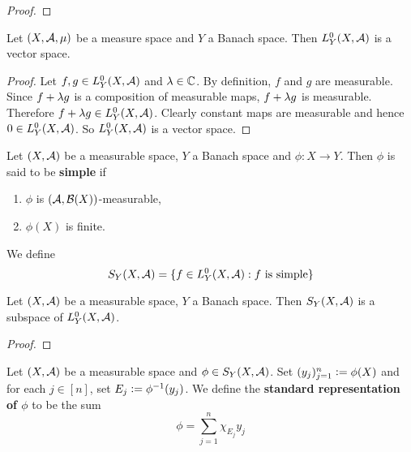 \documentclass{book}
\begin{document}
	\begin{proof}
		
	\end{proof}


	
	\begin{ex}  
	Let $(X, \mathcal{A}, \mu)$ be a measure space and $Y$ a Banach space. Then $L_Y^0(X, \mathcal{A})$ is a vector space.
	\end{ex}
	
	\begin{proof}
	Let $f, g \in L_Y^0(X, \mathcal{A})$ and $\lambda \in \mathbb{C}$. By definition, $f$ and $g$ are measurable. Since $f+\lambda g $ is a composition of measurable maps, $f + \lambda g$ is measurable. Therefore $f + \lambda g \in L_Y^0(X, \mathcal{A})$. Clearly constant maps are measurable and hence $0 \in L_Y^0(X, \mathcal{A})$. So $L_Y^0(X, \mathcal{A})$ is a vector space. 
	\end{proof}

	\begin{defn}  
		Let $(X, \mathcal{A})$ be a measurable space, $Y$ a Banach space and $\phi: X \rightarrow Y$. Then $\phi$ is said to be \textbf{simple} if 
		\begin{enumerate}
			\item $\phi$ is $(\mathcal{A}, \mathcal{B}(X))$-measurable,
			\item $\phi(X)$ is finite.
		\end{enumerate}
		We define 
		$$S_Y(X, \mathcal{A}) = \{f \in L_Y^0(X, \mathcal{A}): f \text{ is simple}\}$$
	\end{defn}

	\begin{ex}
		Let $(X, \mathcal{A})$ be a measurable space, $Y$ a Banach space. Then $S_Y(X, \mathcal{A})$ is a subspace of $L^0_Y(X, \mathcal{A})$.
	\end{ex}

	\begin{proof}
	\end{proof}
	
	\begin{defn}
		Let $(X, \mathcal{A})$ be a measurable space and $\phi \in S_Y(X, \mathcal{A})$. Set $(y_j)_{j=1}^n \vcentcolon= \phi(X)$ and for each $j \in [n]$, set $E_j \vcentcolon= \phi^{-1}(y_j)$. We define the \textbf{standard representation of $\phi$} to be the sum 
		$$\phi = \sum\limits_{j=1}^n \chi_{E_j}y_j$$ 
	\end{defn}
\end{document}
